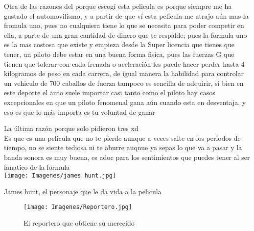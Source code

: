 \documentclass[ä5paper, 11pt]{article}
\begin{document}
\textcolor{naranja}{Otra de las razones del porque escogí esta pelicula es porque siempre me ha gustado el automovilismo, y a partir de que ví esta pelicula me atrajo aún mas la fromula uno, pues no cualquiera tiene lo que se necesita para poder competir en ella, a parte de una gran cantidad de dinero que te respalde; pues la formula uno es la mas costosa que existe y empieza desde la Super licencia que tienes que tener, un piloto debe estar en una buena forma fisica, pues las fuerzas G que tienen que tolerar con cada frenada o aceleración les puede hacer perder hasta 4 kilogramos de peso en cada carrera, de igual manera la habilidad para controlar un vehiculo de 700 caballos de fuerza tampoco es sencilla de adquirir, si bien en este deporte el auto suele importar casi tanto como el piloto hay casos excepcionales en que un piloto fenomenal gana aún cuando esta en desventaja, y eso es que lo más importa es tu voluntad de ganar}

\textcolor{verde}{La última razón porque solo pidieron tres xd\\ Es que es una pelicula que no te pierde aunque a veces salte en los periodos de tiempo, no se siente tediosa ni te aburre auqnue ya sepas lo que va a pasar y la banda sonora es muy buena, es adoc para los sentimientos que puedes tener al ser fanatico de la formula}\\
\texttt{[image: Imagenes/james hunt.jpg]}{\caption{James hunt, el personaje que le da vida a la pelicula}}

\begin{wrapfigure}
\texttt{[image: Imagenes/Reportero.jpg]} {\caption{El reportero que obtiene su merecido}}
\end{wrapfigure}
\\

\hspace{-2.5cm}
\end{document}
